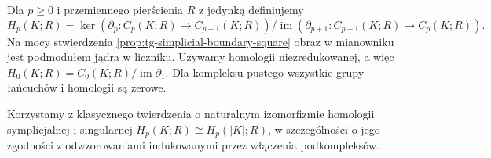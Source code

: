 \begin{definicja}
\label{def:tg-simplicial-homology}
Dla $p\ge0$ i przemiennego pierścienia $R$ z jedynką
definiujemy
\[
H_p(K;R)=
\ker(\partial_p:C_p(K;R)\to C_{p-1}(K;R))/
\operatorname{im}(\partial_{p+1}:C_{p+1}(K;R)\to C_p(K;R)).
\]
Na mocy stwierdzenia \ref{prop:tg-simplicial-boundary-square}
obraz w mianowniku jest podmodułem jądra w liczniku.
Używamy homologii niezredukowanej, a więc
$H_0(K;R)=C_0(K;R)/\operatorname{im}\partial_1$.
Dla kompleksu pustego wszystkie grupy łańcuchów
i homologii są zerowe.
\end{definicja}

Korzystamy z klasycznego twierdzenia o naturalnym
izomorfizmie homologii symplicjalnej i singularnej
$H_p(K;R)\cong H_p(|K|;R)$, w szczególności
o jego zgodności z odwzorowaniami indukowanymi
przez włączenia podkompleksów.

